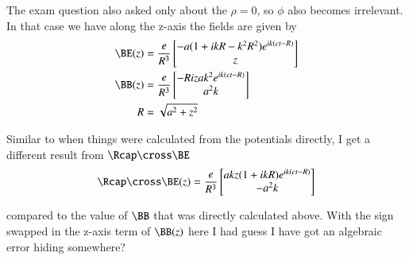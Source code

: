 {The exam question also asked only about the \(\rho = 0\), so \(\phi\) also becomes irrelevant.  In that case we have along the z-axis the fields are given by
%
\begin{equation}\label{eqn:relativisticElectrodynamicsExamReflection:1020}
\begin{aligned}
\BE(z)
&=
\frac{e}{R^3}
\begin{bmatrix}
- a (1 + i k R - k^2 R^2 ) e^{i k (c t - R)} \\
z
\end{bmatrix} \\
\BB(z)
&=
\frac{e}{R^3}
\begin{bmatrix}
-R i z a k^2 e^{i k (c t - R)} \\
a^2 k
\end{bmatrix} \\
R &= \sqrt{a^2 + z^2}
\end{aligned}
\end{equation}

Similar to when things were calculated from the potentials directly, I get a different result from \(\Rcap \cross \BE\)
%
\begin{equation}\label{eqn:relativisticElectrodynamicsExamReflection:1030}
\Rcap \cross \BE(z) = \frac{e}{R^3}
\begin{bmatrix}
a k z (1 + i k R) e^{i k (c t - R)} \\
-a^2 k
\end{bmatrix}
\end{equation}

compared to the value of \(\BB\) that was directly calculated above.  With the sign swapped in the z-axis term of \(\BB(z)\) here I had guess I have got an algebraic error hiding somewhere?

} %

